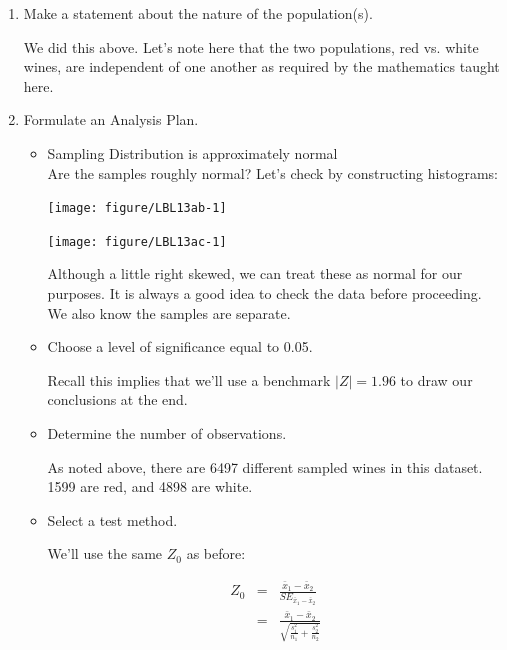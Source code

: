 \documentclass[11pt, chapterprefix=true]{scrbook}\usepackage[]{graphicx}\usepackage[]{color}
\begin{document}
\begin{enumerate}
\item Make a statement about the nature of the population(s).

We did this above. Let’s note here that the two populations, red vs. white wines, are independent of one another as required by the mathematics taught here.

\item Formulate an Analysis Plan.

  \begin{itemize}
  \item Sampling Distribution is approximately normal \\ Are the samples roughly normal? Let’s check by constructing histograms:
  
\begin{minipage}[ht]{6cm}



{\centering \texttt{[image: figure/LBL13ab-1]} 

}




\end{minipage}
\begin{minipage}[ht]{6cm}



{\centering \texttt{[image: figure/LBL13ac-1]} 

}



\end{minipage}


Although a little right skewed, we can treat these as normal for our purposes. It is always a good idea to check the data before proceeding. We also know the samples are separate.

  \item Choose a level of significance equal to 0.05.

  Recall this implies that we'll use a benchmark $|Z| = 1.96$ to draw our conclusions at the end.
  
  \item Determine the number of observations.
  
  As noted above, there are 6497 different sampled wines in this dataset. 1599 are
red, and 4898 are white.

  \item Select a test method.
  
  We'll use the same $Z_0$ as before:
  
    \begin{eqnarray*}
    Z_0 &=& \frac{ \bar{x}_1 - \bar{x}_2}{SE_{\bar{x}_1 - \bar{x}_2}} \\
      &=& \frac{ \bar{x}_1 - \bar{x}_2}{ \sqrt{ \frac{s_1^2}{n_1} + \frac{s_2^2}{n_2}} }
   \end{eqnarray*} 


\end{itemize}
\end{enumerate}
\end{document}
